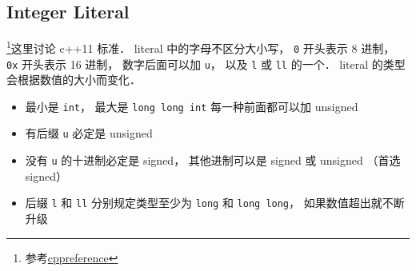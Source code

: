 \subsection{Integer Literal}
\footnote{参考\href{https://en.cppreference.com/w/cpp/language/integer_literal}{cppreference}}这里讨论 c++11 标准． literal 中的字母不区分大小写， \verb|0| 开头表示 8 进制，  \verb|0x| 开头表示 16 进制， 数字后面可以加 \verb|u|， 以及 \verb|l| 或 \verb|ll| 的一个． literal 的类型会根据数值的大小而变化．

\begin{itemize}
\item 最小是 \verb|int|， 最大是 \verb|long long int| 每一种前面都可以加 unsigned
\item 有后缀 \verb|u| 必定是 unsigned
\item 没有 \verb|u| 的十进制必定是 signed， 其他进制可以是 signed 或 unsigned （首选 signed）
\item 后缀 \verb|l| 和 \verb|ll| 分别规定类型至少为 \verb|long| 和 \verb|long long|， 如果数值超出就不断升级
\end{itemize}
